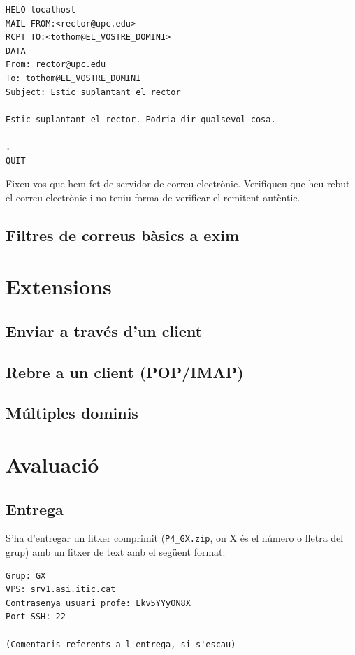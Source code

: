 \documentclass{practicaitic}
\begin{document}
\begin{tcolorbox}[
  colback=gray!10, colframe=gray!50,
  rounded corners
]
\begin{verbatim}
HELO localhost
MAIL FROM:<rector@upc.edu>
RCPT TO:<tothom@EL_VOSTRE_DOMINI>
DATA
From: rector@upc.edu
To: tothom@EL_VOSTRE_DOMINI
Subject: Estic suplantant el rector

Estic suplantant el rector. Podria dir qualsevol cosa.

.
QUIT
\end{verbatim}
\end{tcolorbox}

Fixeu-vos que hem fet de servidor de correu electrònic. Verifiqueu que heu rebut
el correu electrònic i no teniu forma de verificar el remitent autèntic.

\subsection{Filtres de correus bàsics a exim}

\section{Extensions}
\subsection{Enviar a través d'un client}
\subsection{Rebre a un client (POP/IMAP)}
\subsection{Múltiples dominis}

\section{Avaluació}
\subsection{Entrega}
\label{sec:entrega}

S'ha d'entregar un fitxer comprimit (\texttt{P4\_GX.zip}, on X és el número o 
lletra del grup) amb un fitxer de text amb el següent format:

\begin{verbatim}
Grup: GX
VPS: srv1.asi.itic.cat
Contrasenya usuari profe: Lkv5YYyON8X
Port SSH: 22

(Comentaris referents a l'entrega, si s'escau)
\end{verbatim}
\end{document}
